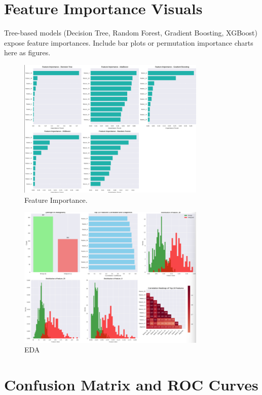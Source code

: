 \documentclass[11pt]{article}
\begin{document}
\section{Feature Importance Visuals}
Tree-based models (Decision Tree, Random Forest, Gradient Boosting, XGBoost) expose feature importances. Include bar plots or permutation importance charts here as figures.

\begin{figure}[H]
\centering
\includegraphics[width=0.8\textwidth]{f1.png}
\caption{Feature Importance.}
\end{figure}

\begin{figure}[H]
\centering
\includegraphics[width=0.8\textwidth]{f2.png}
\caption{EDA}
\end{figure}

\section{Confusion Matrix and ROC Curves}
\end{document}
